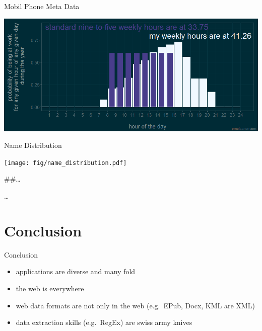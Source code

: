 \documentclass[ignorenonframetext,]{beamer}
\providecommand{\tightlist}{%
  \setlength{\itemsep}{0pt}\setlength{\parskip}{0pt}}
\begin{document}
\begin{frame}{Mobil Phone Meta Data}

\includegraphics{fig/mobil_meta2.png}

\end{frame}

\begin{frame}{Name Distribution}

\texttt{[image: fig/name\_distribution.pdf]}

\#\#\ldots{}

\ldots{}

\end{frame}

\section{Conclusion}\label{conclusion}

\begin{frame}{Conclusion}

\begin{itemize}
\tightlist
\item
  applications are diverse and many fold
\item
  the web is everywhere
\item
  web data formats are not only in the web (e.g.~EPub, Docx, KML are
  XML)
\item
  data extraction skills (e.g.~RegEx) are swiss army knives
\end{itemize}

\end{frame}
\end{document}

